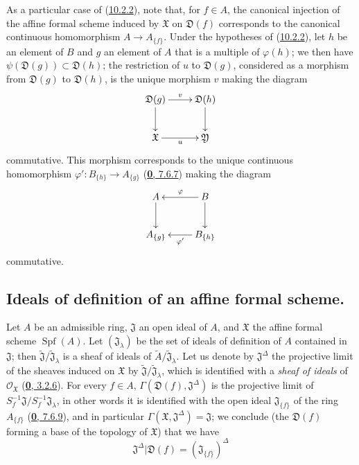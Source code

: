 \begin{env}[10.2.3]
\label{I.10.2.3}
As a particular case of (\hyperref[I.10.2.2]{10.2.2}), note that, for
$f\in A$, the canonical injection of the affine formal scheme induced by
$\mathfrak{X}$ on $\mathfrak{D}(f)$ corresponds to the canonical continuous
homomorphism $A\to A_{\{f\}}$. Under the hypotheses of
(\hyperref[I.10.2.2]{10.2.2}), let $h$ be an element of $B$ and $g$ an
element of $A$ that is a multiple of $\varphi(h)$; we then have
$\psi(\mathfrak{D}(g))\subset\mathfrak{D}(h)$; the restriction of $u$ to
$\mathfrak{D}(g)$, considered as a morphism from $\mathfrak{D}(g)$ to
$\mathfrak{D}(h)$, is the unique morphism $v$ making the
diagram
\[
  \xymatrix{
    \mathfrak{D}(g)\ar[r]^v\ar[d] &
    \mathfrak{D}(h)\ar[d]\\
    \mathfrak{X}\ar[r]_u &
    \mathfrak{Y}
  }
\]
commutative. This morphism corresponds to the unique continuous homomorphism
$\varphi':B_{\{h\}}\to A_{\{g\}}$
(\hyperref[0.7.6.7]{\textbf{0}, 7.6.7}) making the diagram
\[
  \xymatrix{
    A\ar[d] &
    B\ar[l]_\varphi\ar[d]\\
    A_{\{g\}} &
    B_{\{h\}}\ar[l]^{\varphi'}
  }
\]
commutative.
\end{env}

\subsection{Ideals of definition of an affine formal scheme.}
\label{subsection:I.10.3}

\begin{env}[10.3.1]
\label{I.10.3.1}
Let $A$ be an admissible ring, $\mathfrak{J}$ an open ideal of $A$, and
$\mathfrak{X}$ the affine formal scheme $\operatorname{Spf}(A)$. Let
$(\mathfrak{J}_\lambda)$ be the set of ideals of definition of $A$
contained in $\mathfrak{J}$; then
$\widetilde{\mathfrak{J}}/\widetilde{\mathfrak{J}}_\lambda$ is a
sheaf of ideals of
$\widetilde{A}/\widetilde{\mathfrak{J}}_\lambda$. Let us denote by
$\mathfrak{J}^\Delta$ the projective limit of the sheaves induced on
$\mathfrak{X}$ by
$\widetilde{\mathfrak{J}}/\widetilde{\mathfrak{J}}_\lambda$, which
is identified with a \emph{sheaf of ideals} of
$\mathscr{O}_{\mathfrak{X}}$ (\hyperref[0.3.2.6]{\textbf{0}, 3.2.6}). For every
$f\in A$, $\Gamma(\mathfrak{D}(f),\mathfrak{J}^\Delta)$ is the projective
limit of
$S_f^{-1}\mathfrak{J}/S_f^{-1}\mathfrak{J}_\lambda$, in other words it
is identified with the open ideal $\mathfrak{J}_{\{f\}}$ of the ring
$A_{\{f\}}$ (\hyperref[0.7.6.9]{\textbf{0}, 7.6.9}), and in particular
$\Gamma(\mathfrak{X},\mathfrak{J}^\Delta)=\mathfrak{J}$; we conclude
(the $\mathfrak{D}(f)$ forming a base of the topology of $\mathfrak{X}$)
that we have
\[
  \mathfrak{J}^\Delta|\mathfrak{D}(f)
  =(\mathfrak{J}_{\{f\}})^\Delta
  \tag{10.3.1.1}\label{I.10.3.1.1}
\]
\end{env}

